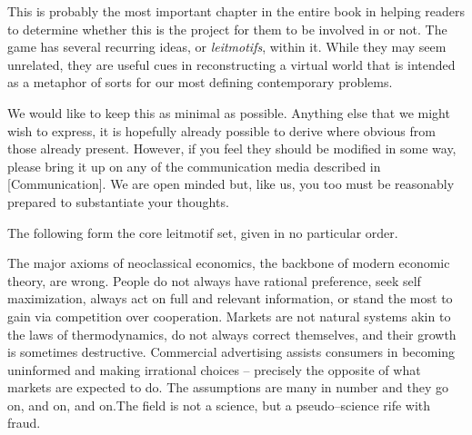 

This is probably the most important chapter in the entire book in helping readers to determine whether this is the project for them to be involved in or not. The game has several recurring ideas, or {\it leitmotifs}, within it. While they may seem unrelated, they are useful cues in reconstructing a virtual world that is intended as a metaphor of sorts for our most defining contemporary problems.

We would like to keep this  as minimal as possible. Anything else that we might wish to express, it is hopefully already possible to derive where obvious from those already present. However, if you feel they should be modified in some way, please bring it up on any of the communication media described in [Communication]. We are open minded but, like us, you too must be reasonably prepared to substantiate your thoughts.

The following form the core leitmotif set, given in no particular order. 

\startitemize[4]

The major axioms of neoclassical economics, the backbone of modern economic theory, are wrong. People do not always have rational preference, seek self maximization, always act on full and relevant information, or stand the most to gain via competition over cooperation. Markets are not natural systems akin to the laws of thermodynamics, do not always correct themselves, and their growth is sometimes destructive. Commercial advertising assists consumers in becoming uninformed and making irrational choices -- precisely the opposite of what markets are expected to do. The assumptions are many in number and they go on, and on, and on.\footnotecite[h2oil]\footnotecite[raj2010]\footnotecite[cobb1999]\footnotecite[extras={ See sections 4.6 and 4.11.}][agenda_21] The field is not a science, but a pseudo--science rife with fraud.


